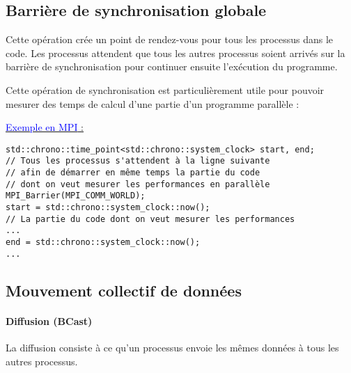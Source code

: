 \documentclass[fleqn,11pt]{article}
\begin{document}
\subsection{Barrière de synchronisation globale}

Cette opération crée un point de rendez-vous pour tous les processus dans le code.
Les processus attendent que tous les autres processus soient arrivés sur la barrière
de synchronisation pour continuer ensuite l'exécution du programme.

Cette opération de synchronisation est particulièrement utile pour pouvoir mesurer
des temps de calcul d'une partie d'un programme parallèle :

\underline{\textcolor{blue}{Exemple en MPI} :}

\begin{lstlisting}
std::chrono::time_point<std::chrono::system_clock> start, end;
// Tous les processus s'attendent à la ligne suivante
// afin de démarrer en même temps la partie du code
// dont on veut mesurer les performances en parallèle
MPI_Barrier(MPI_COMM_WORLD);
start = std::chrono::system_clock::now();
// La partie du code dont on veut mesurer les performances
...
end = std::chrono::system_clock::now();
...
\end{lstlisting}

\subsection{Mouvement collectif de données}

\paragraph{Diffusion (BCast)}

La diffusion consiste à ce qu'un processus envoie les mêmes données à tous
les autres processus. 
\end{document}

